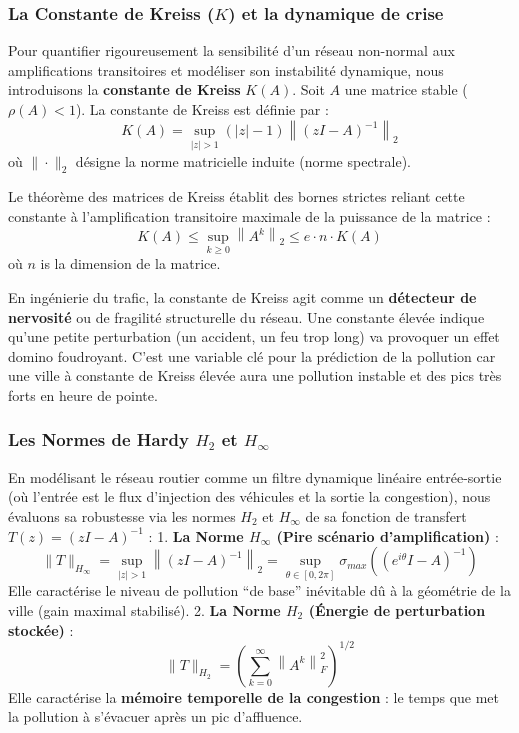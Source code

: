 \documentclass[10pt, a4paper]{article}
\begin{document}
\subsubsection{\texorpdfstring{La Constante de Kreiss (\(K\)) et la
dynamique de
crise}{La Constante de Kreiss (K) et la dynamique de crise}}\label{la-constante-de-kreiss-k-et-la-dynamique-de-crise}

Pour quantifier rigoureusement la sensibilité d'un réseau non-normal aux
amplifications transitoires et modéliser son instabilité dynamique, nous
introduisons la \textbf{constante de Kreiss} \(K(A)\). Soit \(A\) une
matrice stable (\(\rho(A) < 1\)). La constante de Kreiss est définie par
: \[K(A) = \sup_{|z| > 1} (|z| - 1) \left\| (zI - A)^{-1} \right\|_2\]
où \(\|\cdot\|_2\) désigne la norme matricielle induite (norme
spectrale).

Le théorème des matrices de Kreiss établit des bornes strictes reliant
cette constante à l'amplification transitoire maximale de la puissance
de la matrice :
\[K(A) \le \sup_{k \ge 0} \left\| A^k \right\|_2 \le e \cdot n \cdot K(A)\]
où \(n\) is la dimension de la matrice.

En ingénierie du trafic, la constante de Kreiss agit comme un
\textbf{détecteur de nervosité} ou de fragilité structurelle du réseau.
Une constante élevée indique qu'une petite perturbation (un accident, un
feu trop long) va provoquer un effet domino foudroyant. C'est une
variable clé pour la prédiction de la pollution car une ville à
constante de Kreiss élevée aura une pollution instable et des pics très
forts en heure de pointe.

\subsubsection{\texorpdfstring{Les Normes de Hardy \(H_2\) et
\(H_\infty\)}{Les Normes de Hardy H\_2 et H\_\textbackslash infty}}\label{les-normes-de-hardy-h_2-et-h_infty}

En modélisant le réseau routier comme un filtre dynamique linéaire
entrée-sortie (où l'entrée est le flux d'injection des véhicules et la
sortie la congestion), nous évaluons sa robustesse via les normes
\(H_2\) et \(H_\infty\) de sa fonction de transfert
\(T(z) = (zI - A)^{-1}\) : 1. \textbf{La Norme \(H_\infty\) (Pire
scénario d'amplification)} :
\[\|T\|_{H_\infty} = \sup_{|z| > 1} \left\| (zI - A)^{-1} \right\|_2 = \sup_{\theta \in [0, 2\pi]} \sigma_{max}\left( (e^{i\theta}I - A)^{-1} \right)\]
Elle caractérise le niveau de pollution ``de base'' inévitable dû à la
géométrie de la ville (gain maximal stabilisé). 2. \textbf{La Norme
\(H_2\) (Énergie de perturbation stockée)} :
\[\|T\|_{H_2} = \left( \sum_{k=0}^{\infty} \left\| A^k \right\|_F^2 \right)^{1/2}\]
Elle caractérise la \textbf{mémoire temporelle de la congestion} : le
temps que met la pollution à s'évacuer après un pic d'affluence.
\end{document}
